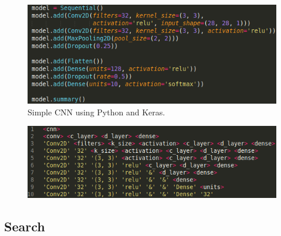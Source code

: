\documentclass[12pt]{article}
\begin{document}
\begin{figure}[!htb]
	\includegraphics[width=\linewidth]{images/cnn-model-example.png}
	\caption{Simple CNN using Python and Keras.}
	\label{fig:cnn-model}
\end{figure}


\begin{figure}
	\includegraphics[]{images/expansion_example.png}
\end{figure}


\subsection{Search}



\end{document}
